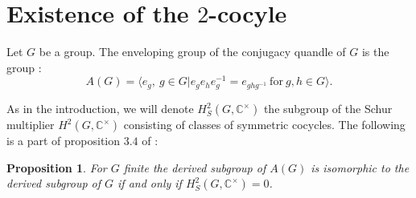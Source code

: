 \documentclass[12pt, reqno]{amsart}
\newtheorem{proposition}[theorem]{Proposition}
\begin{document}
 \section{Existence of the $2$-cocyle}
Let $G$ be a group. The enveloping group of the conjugacy quandle of $G$ is the group :
$$ A(G)=\langle e_g,\: g\in G \vert e_ge_he_g^{-1}=e_{ghg^{-1}} \: \text{for} \: g,h\in G \rangle.$$

As in the introduction, we will denote $H_S^2(G,\mathbb{C}^\times)$ the subgroup of the Schur multiplier $H^2(G,\mathbb{C}^\times)$ consisting of classes of symmetric cocycles. The following is a part of proposition $3.4$ of \cite{Cq} : 
\begin{proposition}\label{cor}
For $G$ finite the derived subgroup of $A(G)$ is isomorphic to the derived subgroup of $G$ if and only if $H^2_S(G,\mathbb{C}^\times)=0$.
\end{proposition}
 
\end{document}

